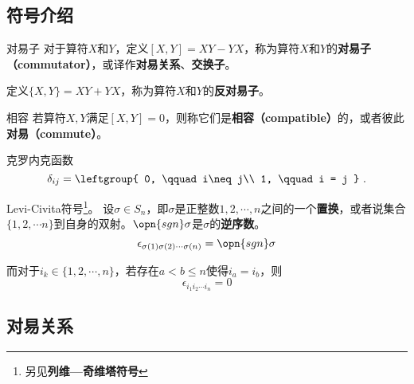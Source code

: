 


\subsection{符号介绍}

\begin{definition}{对易子}\label{def_ComOpQ_13}
对于算符$X$和$Y$，定义$[X, Y]=XY-YX$，称为算符$X$和$Y$的\textbf{对易子（commutator）}，或译作\textbf{对易关系}、\textbf{交换子}。

定义$\{X, Y\}=XY+YX$，称为算符$X$和$Y$的\textbf{反对易子}。
\end{definition}


\begin{definition}{相容}\label{def_ComOpQ_17}
若算符$X, Y$满足$[X, Y]=0$，则称它们是\textbf{相容（compatible）}的，或者彼此\textbf{对易（commute）}。
\end{definition}



\begin{definition}{克罗内克函数}
\begin{equation}
\delta_{ij} = \leftgroup{
    0, \qquad i\neq j\\
    1, \qquad i = j
}~.
\end{equation}
\end{definition}




\begin{definition}{Levi-Civita符号\footnote{另见\textbf{列维—奇维塔符号}}。}
设$\sigma\in S_n$，即$\sigma$是正整数$1, 2, \cdots, n$之间的一个\textbf{置换}，或者说集合$\{1, 2, \cdots n\}$到自身的双射。$\opn{sgn}\sigma$是$\sigma$的\textbf{逆序数}。
\begin{equation}
\epsilon_{\sigma(1) \sigma(2) \cdots \sigma(n)}=\opn{sgn}\sigma
\end{equation}

而对于$i_k\in\{1, 2, \cdots, n\}$，若存在$a<b\leq n$使得$i_a=i_b$，则
\begin{equation}
\epsilon_{i_1 i_2 \cdots i_n} = 0
\end{equation}

\end{definition}


\subsection{对易关系}


